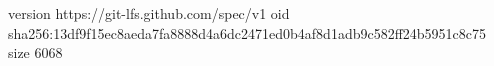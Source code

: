 version https://git-lfs.github.com/spec/v1
oid sha256:13df9f15ec8aeda7fa8888d4a6dc2471ed0b4af8d1adb9c582ff24b5951c8c75
size 6068
